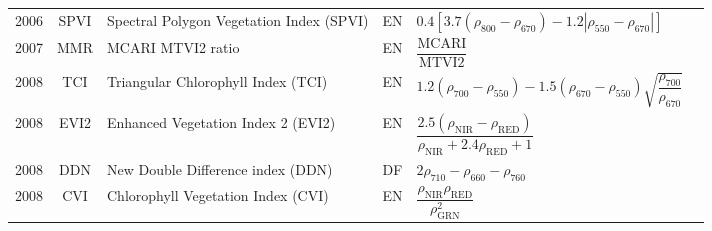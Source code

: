 \documentclass[10pt]{article}
\begin{document}
\begin{ThreePartTable}
\begin{longtable}{c c m{2.3in} c M{2.8in} M{1.5in}}
  2006 & SPVI    & Spectral Polygon Vegetation Index (SPVI)                                       & EN & $0.4[3.7(\rho_{800}-\rho_{670})-1.2|\rho_{550}-\rho_{670}|]$                                                                                                                                                                                                                            & \citet{Vincini2006}                                 \\
  2007 & MMR     & MCARI MTVI2 ratio                                                              & EN & $\dfrac{\text{MCARI}}{\text{MTVI2}}$                                                                                                                                                                                                                                                    & \citet{Eitel2007}                                   \\
  2008 & TCI     & Triangular Chlorophyll Index (TCI)                                             & EN & $1.2(\rho_{700}-\rho_{550})-1.5(\rho_{670}-\rho_{550})\sqrt{\dfrac{\rho_{700}}{\rho_{670}}}$                                                                                                                                                                                            & \citet{Haboudane2008}                               \\
  2008 & EVI2    & Enhanced Vegetation Index 2 (EVI2)                                             & EN & $\dfrac{2.5(\rho_\text{NIR}-\rho_\text{RED})}{\rho_\text{NIR}+2.4\rho_\text{RED}+1}$                                                                                                                                                                                                    & \citet{Jiang2008}                                   \\
  2008 & DDN     & New Double Difference index (DDN)                                              & DF & $2\rho_{710}-\rho_{660}-\rho_{760}$                                                                                                                                                                                                                                                     & \citet{LeMaire2008}                                 \\
  2008 & CVI     & Chlorophyll Vegetation Index (CVI)                                             & EN & $\dfrac{\rho_\text{NIR}\rho_\text{RED}}{\rho^2_\text{GRN}}$                                                                                                                                                                                                                             & \citet{Vincini2008}                                 \\

\end{longtable}
\end{ThreePartTable}
\end{document}
